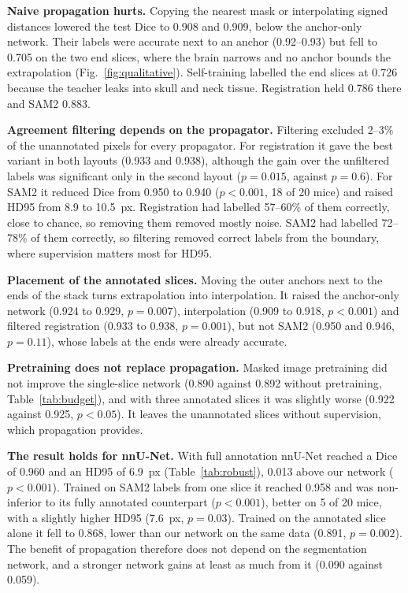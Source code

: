 \documentclass{article}
\begin{document}
\textbf{Naive propagation hurts.} Copying the nearest mask or interpolating signed distances lowered the test Dice to 0.908 and 0.909, below the anchor-only network. Their labels were accurate next to an anchor (0.92--0.93) but fell to 0.705 on the two end slices, where the brain narrows and no anchor bounds the extrapolation (Fig.~\ref{fig:qualitative}). Self-training labelled the end slices at 0.726 because the teacher leaks into skull and neck tissue. Registration held 0.786 there and SAM2 0.883.

\textbf{Agreement filtering depends on the propagator.} Filtering excluded 2--3\% of the unannotated pixels for every propagator. For registration it gave the best variant in both layouts (0.933 and 0.938), although the gain over the unfiltered labels was significant only in the second layout ($p=0.015$, against $p=0.6$). For SAM2 it reduced Dice from 0.950 to 0.940 ($p<0.001$, 18 of 20 mice) and raised HD95 from 8.9 to 10.5~px. Registration had labelled 57--60\% of them correctly, close to chance, so removing them removed mostly noise. SAM2 had labelled 72--78\% of them correctly, so filtering removed correct labels from the boundary, where supervision matters most for HD95.

\textbf{Placement of the annotated slices.} Moving the outer anchors next to the ends of the stack turns extrapolation into interpolation. It raised the anchor-only network (0.924 to 0.929, $p=0.007$), interpolation (0.909 to 0.918, $p<0.001$) and filtered registration (0.933 to 0.938, $p=0.001$), but not SAM2 (0.950 and 0.946, $p=0.11$), whose labels at the ends were already accurate.

\textbf{Pretraining does not replace propagation.} Masked image pretraining did not improve the single-slice network (0.890 against 0.892 without pretraining, Table~\ref{tab:budget}), and with three annotated slices it was slightly worse (0.922 against 0.925, $p<0.05$). It leaves the unannotated slices without supervision, which propagation provides.

\textbf{The result holds for nnU-Net.} With full annotation nnU-Net reached a Dice of 0.960 and an HD95 of 6.9~px (Table~\ref{tab:robust}), 0.013 above our network ($p<0.001$). Trained on SAM2 labels from one slice it reached 0.958 and was non-inferior to its fully annotated counterpart ($p<0.001$), better on 5 of 20 mice, with a slightly higher HD95 (7.6~px, $p=0.03$). Trained on the annotated slice alone it fell to 0.868, lower than our network on the same data (0.891, $p=0.002$). The benefit of propagation therefore does not depend on the segmentation network, and a stronger network gains at least as much from it (0.090 against 0.059).
\end{document}
